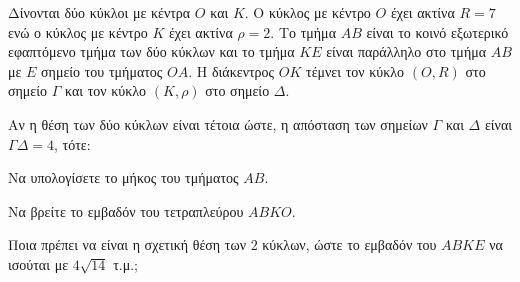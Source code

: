 Δίνονται δύο κύκλοι με κέντρα $O$ και $K$. Ο κύκλος με κέντρο $O$ έχει ακτίνα $R=7$ ενώ ο κύκλος με κέντρο $K$ έχει ακτίνα $\rho=2$. Το τμήμα $AB$ είναι το κοινό εξωτερικό εφαπτόμενο τμήμα των δύο κύκλων και το τμήμα $KE$ είναι παράλληλο στο τμήμα $AB$ με $E$ σημείο του τμήματος $OA$. Η διάκεντρος $OK$ τέμνει τον κύκλο $(O,R)$ στο σημείο $\Gamma$ και τον κύκλο $(K,\rho)$ στο σημείο $\Delta$.
\begin{alist}
    \item Αν η θέση των δύο κύκλων είναι τέτοια ώστε, η απόσταση των σημείων $\Gamma$ και $\Delta$ είναι $\Gamma\Delta=4$, τότε:
    \begin{rlist}
        \item Να υπολογίσετε το μήκος του τμήματος $AB$.  
        \item Να βρείτε το εμβαδόν του τετραπλεύρου $ABKO$.  
    \end{rlist}
    \item Ποια πρέπει να είναι η σχετική θέση των $2$ κύκλων, ώστε το εμβαδόν του $ABKE$ να ισούται με $4\sqrt{14}$ τ.μ.; 
\end{alist}